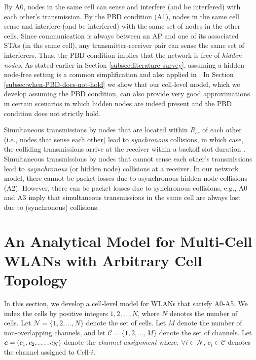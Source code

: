 \documentclass[10pt,a4paper,journal]{IEEEtran}
\theoremstyle{definition}
\theoremstyle{remark}
\theoremstyle{plain}
\newcommand{\bmath}[1]{\mbox{\boldmath$#1$}}
\begin{document}
By A0, nodes in the same cell can sense and interfere (and be interfered) with each other's transmission. By the PBD condition (A1), nodes in the same cell sense and interfere (and be interfered) with the same set of nodes in the other cells. Since communication is always between an AP and one of its associated STAs (in the same cell), any transmitter-receiver pair can sense the same set of interferers. Thus, the PBD condition implies that the network is free of \textit{hidden nodes}. As stated earlier in Section \ref{subsec:literature-survey}, assuming a hidden-node-free setting is a common simplification and also applied in \cite{wanet.durvy09selfOrganization,wanet.bonald08multicellprocsharing,wanet.jiang-liew08MobComp-HNEN,wanet.liew_etal09mobicom-capacity-wireless-networks,wanet.liew_etal09ICCback-of-the-envelope}. In Section \ref{subsec:when-PBD-does-not-hold} we show that our cell-level model, which we develop assuming the PBD condition, can also provide very good approximations in certain scenarios in which hidden nodes are indeed present and the PBD condition does not strictly hold. 

Simultaneous transmissions by nodes that are located within $R_{cs}$ of each other (i.e., nodes that sense each other) lead to \textit{synchronous} collisions, in which case, the colliding transmissions arrive at the receiver within a backoff slot duration \cite{wanet.roy_etal09ToN-PCS}. Simultaneous transmissions by nodes that cannot sense each other's transmissions lead to \textit{asynchronous} (or hidden node) collisions at a receiver. In our network model, there cannot be packet losses due to asynchronous hidden node collisions (A2). However, there can be packet losses due to synchronous collisions, e.g., A0 and A3 imply that simultaneous transmissions in the same cell are always lost due to (synchronous) collisions. 



\section{An Analytical Model for Multi-Cell WLANs with Arbitrary Cell Topology}
\label{sec:analysis-multicell-arbitrary-cell-topology}



In this section, we develop a cell-level model for WLANs that satisfy A0-A5. We index the cells by positive integers $1, 2, \ldots, N$, where $N$ denotes the number of cells. Let $\mathcal{N} = \{1, 2, \ldots, N\}$ denote the set of cells. Let $M$ denote the number of non-overlapping channels, and let $\mathcal{C} = \{1, 2, \ldots, M\}$ denote the set of channels. Let $\bmath{c} = (c_1, c_2, \ldots, c_N)$ denote the \textit{channel assignment} where, $\forall i \in \mathcal{N}$, $c_i \in \mathcal{C}$ denotes the channel assigned to Cell-$i$. 
\end{document}
